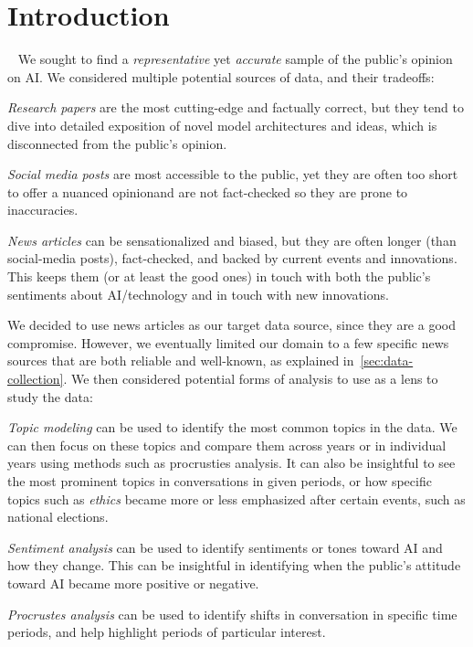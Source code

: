 \section{Introduction}~\label{sec:introduction}
We sought to find a \emph{representative} yet \emph{accurate} sample of the public's opinion on AI.
We considered multiple potential sources of data, and their tradeoffs:
\begin{enumroman}
  \item \emph{Research papers} are the most cutting-edge and factually correct, but they
    tend to dive into detailed exposition of novel
    model architectures and ideas, which is disconnected
    from the public's opinion.
  \item \emph{Social media posts} are most accessible to the public, yet they are often too short to offer a nuanced
    opinionand are not fact-checked so they are prone to inaccuracies.
  \item \emph{News articles} can be sensationalized and biased, but they
    are often longer (than social-media posts), fact-checked, and backed by current events
    and innovations. This keeps them (or at least the good ones) in touch with both
    the public's sentiments about AI/technology and in touch with new innovations.
\end{enumroman}

We decided to use news articles as our target data source, since they are a good compromise.
However, we eventually limited our domain to a few specific news sources
that are both reliable and well-known, as explained in~\cref{sec:data-collection}. 
We then considered potential forms of analysis to use as a lens to study the data:
\begin{enumroman}
  \item \emph{Topic modeling} can be used to identify the most common topics
    in the data. We can then focus on these topics and compare them across years
    or in individual years using methods such as procrusties analysis.
    It can also be insightful to see the most prominent topics in conversations
    in given periods, or how specific topics such as \emph{ethics}
    became more or less emphasized after certain events, such as national elections.
  \item \emph{Sentiment analysis} can be used to identify sentiments or tones
    toward AI and how they change.
    This can be insightful in identifying when the public's attitude toward AI became more positive
    or negative.
  \item \emph{Procrustes analysis} can be used to identify shifts in conversation
    in specific time periods, and help highlight periods of particular interest.
\end{enumroman}
